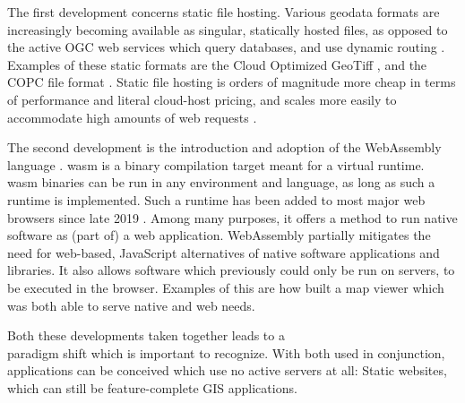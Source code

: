 The first development concerns static file hosting.
Various geodata formats are increasingly becoming available as singular, statically hosted files, 
as opposed to the active \ac{OGC} web services which query databases, and use dynamic routing \citep{open_geospatial_consortium_web_2015}.
Examples of these static formats are the Cloud Optimized GeoTiff \citep{sarago_cloud_2021}, and the COPC file format \citep{bell_cloud_2021}. 
Static file hosting is orders of magnitude more cheap in terms of performance and literal cloud-host pricing, and scales more easily to accommodate high amounts of web requests \citep{sarago_cloud_2021}.

The second development is the introduction and adoption of the WebAssembly language \citep{haas_bringing_2017}. 
\ac{wasm} is a binary compilation target meant for a virtual runtime. 
\ac{wasm} binaries can be run in any environment and language, as long as such a runtime is implemented. 
Such a runtime has been added to most major web browsers since late 2019 \citep{w3c_world_2019}. 
Among many purposes, it offers a method to run native software as (part of) a web application. 
WebAssembly partially mitigates the need for web-based, JavaScript alternatives of native software applications and libraries. 
It also allows software which previously could only be run on servers, to be executed in the browser. 
Examples of this are how \citet{ammann_maplibre-rs_2022} built a map viewer which was both able to serve native and web needs.


Both these developments taken together leads to a \\
paradigm shift which is important to recognize.
With both used in conjunction, applications can be conceived which use no active servers at all: Static websites, which can still be feature-complete \ac{GIS} applications.




